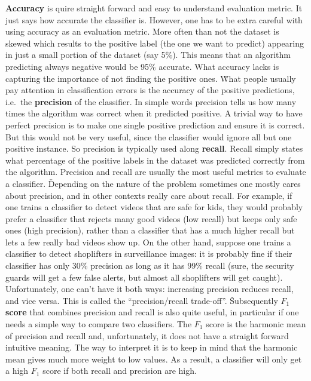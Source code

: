 \textbf{Accuracy} is quire straight forward and easy to understand evaluation metric. It just says how accurate the
classifier is. However, one has to be extra careful with using accuracy as an evaluation metric. More often than not
the dataset is skewed which results to the positive label (the one we want to predict) appearing in just a small
portion of the dataset (say 5\%). This means that an algorithm predicting always negative would be 95\% accurate.
What accuracy lacks is capturing the importance of not finding the positive ones. \v

What people usually pay attention in classification errors is the accuracy of the positive predictions, i.e.\ the
\textbf{precision} of the classifier. In simple words precision tells us how many times the algorithm was correct
when it predicted positive. A trivial way to have perfect precision is to make one single positive prediction and
ensure it is correct. But this would not be very useful, since the classifier would ignore all but one positive
instance. So precision is typically used along \textbf{recall}. Recall simply states what percentage of the positive
labels in the dataset was predicted correctly from the algorithm. Precision and recall are usually the most useful
metrics to evaluate a classifier. \v

Depending on the nature of the problem sometimes one mostly cares about precision, and in other contexts really care
about recall. For example, if one trains a classifier to detect videos that are safe for kids, they would probably
prefer a classifier that rejects many good videos (low recall) but keeps only safe ones (high precision), rather than
a classifier that has a much higher recall but lets a few really bad videos show up. On the other hand, suppose one
trains a classifier to detect shoplifters in surveillance images: it is probably fine if their classifier has only
30\% precision as long as it has 99\% recall (sure, the security guards will get a few false alerts, but almost all
shoplifters will get caught). Unfortunately, one can't have it both ways: increasing precision reduces recall, and
vice versa. This is called the ``precision/recall trade-off''. \v

Subsequently \textbf{$F_1$ score} that combines precision and recall is also quite useful, in particular if one needs
a simple way to compare two classifiers. The $F_1$ score is the harmonic mean of precision and recall and,
unfortunately, it does not have a straight forward intuitive meaning. The way to interpret it is to keep in mind that
the harmonic mean gives much more weight to low values. As a result, a classifier will only get a high $F_1$
score if both recall and precision are high.

